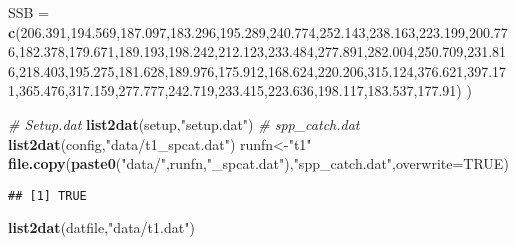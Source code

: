 \documentclass[]{article}
\newenvironment{Shaded}{\begin{snugshade}}{\end{snugshade}}
\newcommand{\CommentTok}[1]{\textcolor[rgb]{0.56,0.35,0.01}{\textit{#1}}}
\newcommand{\DataTypeTok}[1]{\textcolor[rgb]{0.13,0.29,0.53}{#1}}
\newcommand{\FloatTok}[1]{\textcolor[rgb]{0.00,0.00,0.81}{#1}}
\newcommand{\KeywordTok}[1]{\textcolor[rgb]{0.13,0.29,0.53}{\textbf{#1}}}
\newcommand{\NormalTok}[1]{#1}
\newcommand{\OtherTok}[1]{\textcolor[rgb]{0.56,0.35,0.01}{#1}}
\newcommand{\StringTok}[1]{\textcolor[rgb]{0.31,0.60,0.02}{#1}}
\begin{document}
\begin{Shaded}
\begin{Highlighting}[]
    \DataTypeTok{SSB  =} \KeywordTok{c}\NormalTok{(}\FloatTok{206.391}\NormalTok{,}\FloatTok{194.569}\NormalTok{,}\FloatTok{187.097}\NormalTok{,}\FloatTok{183.296}\NormalTok{,}\FloatTok{195.289}\NormalTok{,}\FloatTok{240.774}\NormalTok{,}\FloatTok{252.143}\NormalTok{,}\FloatTok{238.163}\NormalTok{,}\FloatTok{223.199}\NormalTok{,}\FloatTok{200.776}\NormalTok{,}\FloatTok{182.378}\NormalTok{,}\FloatTok{179.671}\NormalTok{,}\FloatTok{189.193}\NormalTok{,}\FloatTok{198.242}\NormalTok{,}\FloatTok{212.123}\NormalTok{,}\FloatTok{233.484}\NormalTok{,}\FloatTok{277.891}\NormalTok{,}\FloatTok{282.004}\NormalTok{,}\FloatTok{250.709}\NormalTok{,}\FloatTok{231.816}\NormalTok{,}\FloatTok{218.403}\NormalTok{,}\FloatTok{195.275}\NormalTok{,}\FloatTok{181.628}\NormalTok{,}\FloatTok{189.976}\NormalTok{,}\FloatTok{175.912}\NormalTok{,}\FloatTok{168.624}\NormalTok{,}\FloatTok{220.206}\NormalTok{,}\FloatTok{315.124}\NormalTok{,}\FloatTok{376.621}\NormalTok{,}\FloatTok{397.171}\NormalTok{,}\FloatTok{365.476}\NormalTok{,}\FloatTok{317.159}\NormalTok{,}\FloatTok{277.777}\NormalTok{,}\FloatTok{242.719}\NormalTok{,}\FloatTok{233.415}\NormalTok{,}\FloatTok{223.636}\NormalTok{,}\FloatTok{198.117}\NormalTok{,}\FloatTok{183.537}\NormalTok{,}\FloatTok{177.91}\NormalTok{)}
\NormalTok{    )}
\end{Highlighting}
\end{Shaded}

\begin{Shaded}
\begin{Highlighting}[]
\CommentTok{\# Setup.dat}
\KeywordTok{list2dat}\NormalTok{(setup,}\StringTok{"setup.dat"}\NormalTok{)}
\CommentTok{\# spp\_catch.dat}
\KeywordTok{list2dat}\NormalTok{(config,}\StringTok{"data/t1\_spcat.dat"}\NormalTok{)}
\NormalTok{runfn\textless{}{-}}\StringTok{"t1"}
\KeywordTok{file.copy}\NormalTok{(}\KeywordTok{paste0}\NormalTok{(}\StringTok{"data/"}\NormalTok{,runfn,}\StringTok{"\_spcat.dat"}\NormalTok{),}\StringTok{"spp\_catch.dat"}\NormalTok{,}\DataTypeTok{overwrite=}\OtherTok{TRUE}\NormalTok{)}
\end{Highlighting}
\end{Shaded}

\begin{verbatim}
## [1] TRUE
\end{verbatim}

\begin{Shaded}
\begin{Highlighting}[]
\KeywordTok{list2dat}\NormalTok{(datfile,}\StringTok{"data/t1.dat"}\NormalTok{)}
\end{Highlighting}
\end{Shaded}
\end{document}
